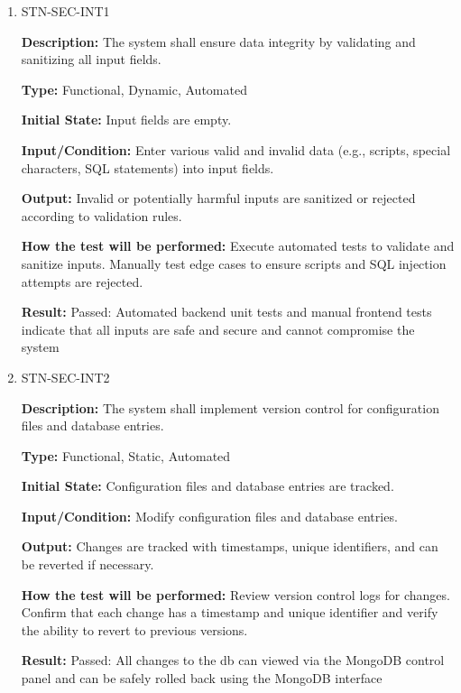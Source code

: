 \documentclass[12pt, titlepage]{article}
\begin{document}
\begin{enumerate}

\item{STN-SEC-INT1\\}

\textbf{Description:} The system shall ensure data integrity by validating and sanitizing all input fields.

\textbf{Type:} Functional, Dynamic, Automated

\textbf{Initial State:} Input fields are empty.

\textbf{Input/Condition:} Enter various valid and invalid data (e.g., scripts, special characters, SQL statements) into input fields.

\textbf{Output:} Invalid or potentially harmful inputs are sanitized or rejected according to validation rules.

\textbf{How the test will be performed:} Execute automated tests to validate and sanitize inputs. Manually test edge cases to ensure scripts and SQL injection attempts are rejected.

\textbf{Result:} Passed: Automated backend unit tests and manual frontend tests indicate that all inputs are safe and secure and cannot compromise the system


\item{STN-SEC-INT2\\}

\textbf{Description:} The system shall implement version control for configuration files and database entries.

\textbf{Type:} Functional, Static, Automated

\textbf{Initial State:} Configuration files and database entries are tracked.

\textbf{Input/Condition:} Modify configuration files and database entries.

\textbf{Output:} Changes are tracked with timestamps, unique identifiers, and can be reverted if necessary.

\textbf{How the test will be performed:} Review version control logs for changes. Confirm that each change has a timestamp and unique identifier and verify the ability to revert to previous versions.

\textbf{Result:} Passed: All changes to the db can viewed via the MongoDB control panel and can be safely rolled back using the MongoDB interface

\end{enumerate}
\end{document}
